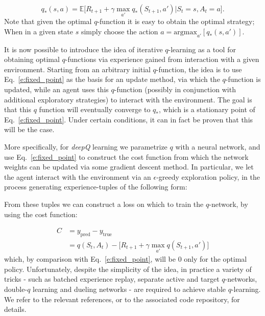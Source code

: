 \documentclass[twocolumn,preprintnumbers,amsmath,amssymb,notitlepage,nofootinbib,longbibliography,superscriptaddress,aps,pra,10pt]{revtex4-1}
\begin{document}
	\begin{equation}\label{e:fixed_point}
		q_*(s,a) = \mathbb{E}\big[R_{t+1} + \gamma\max_{a'}q_{*}(S_{t+1},a')\big|S_t = s, A_t = a \big].
	\end{equation}
	Note that given the optimal $q$-function it is easy to obtain the optimal strategy; When in a given state $s$ simply choose the action $a = \mathrm{argmax}_{a'}[q_*(s,a')]$.

	It is now possible to introduce the idea of iterative $q$-learning as a tool for obtaining optimal $q$-functions via experience gained from interaction with a given environment.
	Starting from an arbitrary initial $q$-function, the idea is to use Eq.~\eqref{e:fixed_point} as the basis for an update method, via which the $q$-function is updated, while an agent uses this $q$-function (possibly in conjunction with additional exploratory strategies) to interact with the environment.
	The goal is that this $q$ function will eventually converge to $q_*$, which is a stationary point of Eq.~\eqref{e:fixed_point}.
	Under certain conditions, it can in fact be proven that this will be the case.

	More specifically, for \textit{deepQ} learning we parametrize $q$ with a neural network, and use Eq.~\eqref{e:fixed_point} to construct the cost function from which the network weights can be updated via some gradient descent method.
	In particular, we let the agent interact with the environment via an $\epsilon$-greedy exploration policy, in the process generating experience-tuples of the following form:

	\begin{equation}
		[S_t,A_t,R_{t+1},S_{t+1}]
	\end{equation}
	From these tuples we can construct a loss on which to train the $q$-network, by using the cost function:

	\begin{align}
		C &= y_{\mathrm{pred}} - y_{\mathrm{true}}\\
		&= q(S_t,A_t) - \big[R_{t+1} + \gamma\max_{a'}q(S_{t+1},a') \big]
	\end{align}
	which, by comparison with Eq.~\eqref{e:fixed_point}, will be 0 only for the optimal policy.
	Unfortunately, despite the simplicity of the idea, in practice a variety of tricks - such as batched experience replay, separate active and target $q$-networks, double-$q$ learning and dueling networks - are required to achieve stable $q$-learning.
	We refer to the relevant references, or to the associated code repository, for details.
\end{document}

